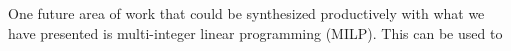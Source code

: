 \documentclass[
	a4paper, %
	10pt, %
	unnumberedsections, %
	twoside, %
]{LTJournalArticle}
\begin{document}
One future area of work that could be synthesized productively with what we have presented is multi-integer linear programming (MILP). This can be used to 






\printbibliography
\end{document}
